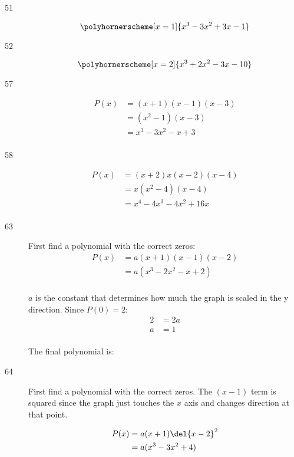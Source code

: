 \documentclass{exam}
\begin{document}
\begin{description}
      \item[51]
        \[
          \polyhornerscheme[x = 1]{x^3 - 3x^2 + 3x - 1}
        \]

      \item[52]
        \[
          \polyhornerscheme[x = 2]{x^3 + 2x^2 - 3x - 10}
        \]

      \item[57]
        \begin{align*}
          P(x) &= (x + 1)(x - 1)(x - 3) \\
          &= (x^2 - 1)(x - 3) \\
          &= \boxed{x^3 - 3x^2 - x + 3} \\
        \end{align*}

      \item[58]
        \begin{align*}
          P(x) &= (x + 2)x(x - 2)(x - 4) \\
               &= x(x^2 - 4)(x - 4) \\
               &= \boxed{x^4 - 4x^3 - 4x^2 + 16x} \\
        \end{align*}

      \item[63]
        First find a polynomial with the correct zeros:
        \begin{align*}
          P(x) &= a(x + 1)(x - 1)(x - 2) \\
               &= a(x^3 - 2x^2 - x + 2) \\
        \end{align*}

        $a$ is the constant that determines how much the graph is scaled in the y direction.  Since $P(0) = 2$:
        \begin{align*}
          2 &= 2a \\
          a &= 1 \\
        \end{align*}

        The final polynomial is: 

      \item[64]
        First find a polynomial with the correct zeros.  The $(x - 1)$ term is squared since the graph just touches the
        $x$ axis and changes direction at that point.

        \begin{align*}
          P(x) &= a(x + 1)\del{x - 2}^2 \\
               &= a(x^3 - 3x^2 + 4) \\
        \end{align*}


\end{description}
\end{document}
